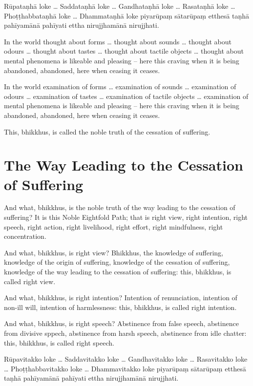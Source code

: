 Rūpataṇhā loke \ldots{} Saddataṇhā loke \ldots{} Gandhataṇhā loke \ldots{}
Rasataṇhā loke \ldots{} Phoṭṭhabbataṇhā loke \ldots{} Dhammataṇhā loke piyarūpaṃ
sātarūpaṃ etthesā taṇhā pahīyamānā pahīyati ettha nirujjhamānā nirujjhati.

\englishPage

In the world thought about forms \ldots{} thought about sounds \ldots{} thought
about odours \ldots{} thought about tastes \ldots{} thought about tactile
objects \ldots{} thought about mental phenomena is likeable and pleasing -- here
this craving when it is being abandoned, abandoned, here when ceasing it ceases.

In the world examination of forms \ldots{} examination of sounds \ldots{}
examination of odours \ldots{} examination of tastes \ldots{} examination of
tactile objects \ldots{} examination of mental phenomena is likeable and
pleasing -- here this craving when it is being abandoned, abandoned, here when
ceasing it ceases.

This, bhikkhus, is called the noble truth of the cessation of suffering.

\section{The Way Leading to the Cessation of Suffering}

And what, bhikkhus, is the noble truth of the way leading to the cessation of
suffering? It is this Noble Eightfold Path; that is right view, right intention,
right speech, right action, right livelihood, right effort, right mindfulness,
right concentration.

And what, bhikkhus, is right view? Bhikkhus, the knowledge of suffering,
knowledge of the origin of suffering, knowledge of the cessation of suffering,
knowledge of the way leading to the cessation of suffering: this, bhikkhus, is
called right view.

And what, bhikkhus, is right intention? Intention of renunciation, intention of
non-ill will, intention of harmlessness: this, bhikkhus, is called right
intention.

And what, bhikkhus, is right speech? Abstinence from false speech, abstinence
from divisive sppech, abstinence from harsh speech, abstinence from idle
chatter: this, bhikkhus, is called right speech.

\paliPage

Rūpavitakko loke \ldots{} Saddavitakko loke \ldots{} Gandhavitakko loke \ldots{}
Rasavitakko loke \ldots{} Phoṭṭhabbavitakko loke \ldots{} Dhammavitakko loke
piyarūpaṃ sātarūpaṃ etthesā taṇhā pahīyamānā pahīyati ettha nirujjhamānā
nirujjhati.

